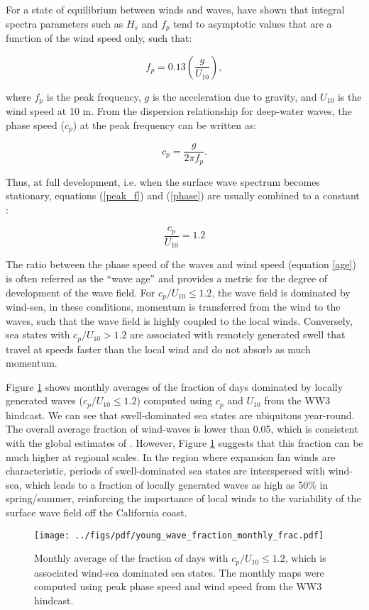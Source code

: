 For a state of equilibrium between winds and waves, \cite{pierson1964proposed} have shown that integral spectra parameters such as $H_s$ and $f_p$ tend to asymptotic values that are a function of the wind speed only, such that:

\begin{equation}
f_p = 0.13\left(\frac{g}{U_{10}}\right),
\label{peak_f}
\end{equation}
 
\noindent where $f_p$ is the peak frequency, $g$ is the acceleration due to gravity, and $U_{10}$ is the wind speed at 10 m. From the dispersion relationship for deep-water waves, the phase speed ($c_p$) at the peak frequency can be written as:

\begin{equation}
c_p = \frac{g}{2\pi f_p}.
\label{phase}
\end{equation}

\noindent Thus, at full development, i.e. when the surface wave spectrum becomes stationary, equations (\ref{peak_f}) and (\ref{phase}) are usually combined to a constant \citep{alves2003revisiting}:

\begin{equation}
\frac{c_p}{U_{10}} = 1.2
\label{age}
\end{equation}
 
The ratio between the phase speed of the waves and wind speed (equation \ref{age}) is often referred as the ``wave age'' and provides a metric for the degree of development of the wave field. For $c_p/U_{10} \leq 1.2$, the wave field is dominated by wind-sea, in these conditions, momentum is transferred from the wind to the waves, such that the wave field is highly coupled to the local winds. Conversely, sea states with $c_p/U_{10} > 1.2$ are associated with remotely generated swell that travel at speeds faster than the local wind and do not absorb as much momentum.
 
Figure \ref{windsea} shows monthly averages of the fraction of days dominated by locally generated waves ($c_p/U_{10} \leq 1.2$) computed using $c_p$ and $U_{10}$ from the WW3 hindcast. We can see that swell-dominated sea states are ubiquitous year-round. The overall average fraction of wind-waves is lower than 0.05, which is consistent with the global estimates of \cite{hanley2010global}. However, Figure \ref{windsea} suggests that this fraction can be much higher at regional scales. In the region where expansion fan winds are characteristic, periods of swell-dominated sea states are interspersed with wind-sea, which leads to a fraction of locally generated waves as high as 50\% in spring/summer, reinforcing the importance of local winds to the variability of the surface wave field off the California coast.
\begin{figure}[h]
\centering
\texttt{[image: ../figs/pdf/young\_wave\_fraction\_monthly\_frac.pdf]}
\caption{ Monthly average of the fraction of days with $c_p/U_{10} \leq 1.2$, which is associated wind-sea dominated sea states. The monthly maps were computed using peak phase speed and wind speed from the WW3 hindcast.}
\label{windsea}
\end{figure}

